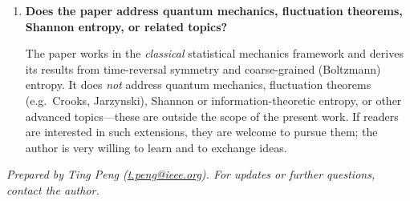 \documentclass[11pt,a4paper]{article}
\begin{document}
\begin{enumerate}[leftmargin=*]
Here entropy is a statistic that reflects particle aggregation or dispersion; it can indicate whether matter has separated, whether mixing is sufficient, and so on. It is therefore useful for \emph{checking whether desired technical outcomes have been achieved} (e.g.\ separation efficiency, degree of mixing). But entropy is \emph{not} the driving force or the law of system change---it is only a \emph{one-dimensional projection} of the system's full information. To understand how the system actually changes, a more reliable approach is to study the \emph{system's concrete laws of motion} directly (e.g.\ how constraints affect the evolution), rather than focusing on entropy. Entropy can serve as a verification index; the underlying dynamics and constraints are what one should rely on for understanding and design.

\item \textbf{Does the paper address quantum mechanics, fluctuation theorems, Shannon entropy, or related topics?}

The paper works in the \emph{classical} statistical mechanics framework and derives its results from time-reversal symmetry and coarse-grained (Boltzmann) entropy. It does \emph{not} address quantum mechanics, fluctuation theorems (e.g.\ Crooks, Jarzynski), Shannon or information-theoretic entropy, or other advanced topics---these are outside the scope of the present work. If readers are interested in such extensions, they are welcome to pursue them; the author is very willing to learn and to exchange ideas.

\end{enumerate}

\vspace{1em}
\noindent
\textit{Prepared by Ting Peng (\href{mailto:t.peng@ieee.org}{t.peng@ieee.org}). For updates or further questions, contact the author.}
\end{document}
